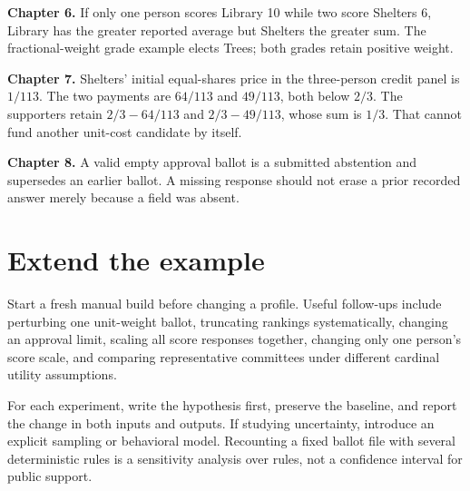 \textbf{Chapter 6.} If only one person scores Library 10 while two score Shelters 6, Library has the greater reported average but Shelters the greater sum. The fractional-weight grade example elects Trees; both grades retain positive weight.

\textbf{Chapter 7.} Shelters' initial equal-shares price in the three-person credit panel is $1/113$. The two payments are $64/113$ and $49/113$, both below $2/3$. The supporters retain $2/3-64/113$ and $2/3-49/113$, whose sum is $1/3$. That cannot fund another unit-cost candidate by itself.

\textbf{Chapter 8.} A valid empty approval ballot is a submitted abstention and supersedes an earlier ballot. A missing response should not erase a prior recorded answer merely because a field was absent.

\section{Extend the example}
Start a fresh manual build before changing a profile. Useful follow-ups include perturbing one unit-weight ballot, truncating rankings systematically, changing an approval limit, scaling all score responses together, changing only one person's score scale, and comparing representative committees under different cardinal utility assumptions.

For each experiment, write the hypothesis first, preserve the baseline, and report the change in both inputs and outputs. If studying uncertainty, introduce an explicit sampling or behavioral model. Recounting a fixed ballot file with several deterministic rules is a sensitivity analysis over rules, not a confidence interval for public support.

